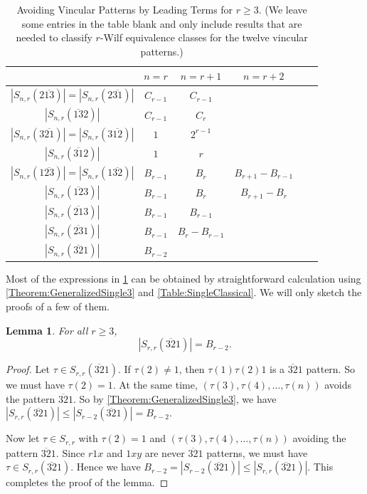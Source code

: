 \documentclass[11pt]{article}
\newtheorem{lemma}[theorem]{Lemma}
\theoremstyle{definition}
\numberwithin{equation}{section}
\begin{document}
\begin{table}[h]
\centering
\renewcommand{\arraystretch}{1.2}
\begin{tabular}{|c||c|c|c|c|c|}
\hline
&$n=r$&$n=r+1$&$n=r+2$\\\hline\hline
$|S_{n,r}(2\overline{13})|=|S_{n,r}(2\overline{31})|$&$C_{r-1}$&$C_{r-1}$&\\\hline
$|S_{n,r}(\overline{13}2)|$&$C_{r-1}$&$C_r$&\\\hline
$|S_{n,r}(3\overline{21})|=|S_{n,r}(3\overline{12})|$&$1$&$2^{r-1}$&\\\hline
$|S_{n,r}(\overline{31}2)|$&$1$&$r$&\\\hline
$|S_{n,r}(1\overline{23})|=|S_{n,r}(1\overline{32})|$&$B_{r-1}$&$B_r$&$B_{r+1}-B_{r-1}$\\\hline
$|S_{n,r}(\overline{12}3)|$&$B_{r-1}$&$B_r$&$B_{r+1}-B_r$\\\hline
$|S_{n,r}(\overline{21}3)|$&$B_{r-1}$&$B_{r-1}$&\\\hline
$|S_{n,r}(\overline{23}1)|$&$B_{r-1}$&$B_r-B_{r-1}$&\\\hline
$|S_{n,r}(\overline{32}1)|$&$B_{r-2}$&&\\\hline
\end{tabular}
\caption{Avoiding Vincular Patterns by Leading Terms for $r\geq3$. (We leave some entries in the table blank and only include results that are needed to classify $r$-Wilf equivalence classes for the twelve vincular patterns.)}\label{Table:GeneralizedPatterns}
\end{table}

Most of the expressions in \cref{Table:GeneralizedPatterns} can be obtained by straightforward calculation 
using \cref{Theorem:GeneralizedSingle3} and \cref{Table:SingleClassical}. We will 
only sketch the proofs of a few of them.



\begin{lemma}
For all $r\geq3$, \[|S_{r,r}(\overline{32}1)|=B_{r-2}.\]
\end{lemma}
\begin{proof}
Let $\tau\in S_{r,r}(\overline{32}1)$. If $\tau(2)\neq 1$, then $\tau(1)\tau(2)1$ is a $\overline{32}1$ pattern. So we must have $\tau(2)=1$. At the same time, $(\tau(3),\tau(4),\ldots,\tau(n))$ avoids the pattern $\overline{32}1$. So by \cref{Theorem:GeneralizedSingle3}, we have $|S_{r,r}(\overline{32}1)|\leq|S_{r-2}(\overline{32}1)|=B_{r-2}$.

Now let $\tau\in S_{r,r}$ with $\tau(2)=1$ and $(\tau(3),\tau(4),\ldots,\tau(n))$ avoiding the pattern $\overline{32}1$. Since $r1x$ and $1xy$ are never $\overline{32}1$ patterns, we must have $\tau\in S_{r,r}(\overline{32}1)$. Hence we have $B_{r-2}=|S_{r-2}(\overline{32}1)|\leq |S_{r,r}(\overline{32}1)|$. This completes the proof of the lemma.
\end{proof}
\end{document}

